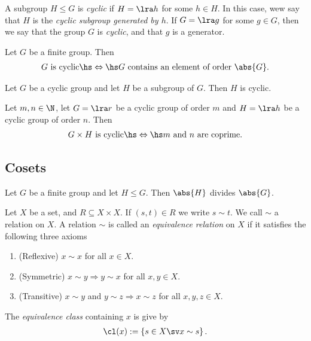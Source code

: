 \documentclass{article}
\begin{document}
\begin{definition}
    A subgroup $H\leq G$ is \emph{cyclic} if $H=\lra h$ for some
    $h\in H$. In this case, wew say that $H$ is the \emph{cyclic subgroup
    generated by $h$}. If $G=\lra g$ for some $g\in G$, then we
    say that the group $G$ is \emph{cyclic}, and that $g$ is a generator.
\end{definition}

\setcounter{theorem}{13}
\begin{lemma}
    Let $G$ be a finite group. Then
    \begin{align*}
        \text{$G$ is cyclic} \hs\Leftrightarrow\hs \text{$G$ contains an element of order $\abs{G}$}.
    \end{align*}
\end{lemma}

\begin{theorem}
    Let $G$ be a cyclic group and let $H$ be a subgroup of $G$. Then
    $H$ is cyclic.
\end{theorem}

\begin{theorem}
    Let $m,n\in\N$, let $G=\lra r$ be a cyclic group of order $m$
    and $H=\lra h$ be a cyclic group of order $n$. Then
    \begin{align*}
        \text{$G\times H$ is cyclic} \hs\Leftrightarrow\hs \text{$m$ and $n$ are coprime.}
    \end{align*}
\end{theorem}

\subsection{Cosets}

\begin{theorem}
    Let $G$ be a finite group and let $H\leq G$.
    Then $\abs{H}$ divides $\abs{G}$. 
\end{theorem}

\begin{definition}
    Let $X$ be a set, and $R\subseteq X\times X$.
    If $(s,t)\in R$ we write $s\sim t$. We call $\sim$
    a relation on $X$. A relation $\sim$ is called an
    \emph{equivalence relation} on $X$ if it satisfies
    the following three axioms
    \begin{enumerate}[label=E\arabic*.]
        \item (Reflexive) $x\sim x$ for all $x\in X$.
        \item (Symmetric) $x\sim y \Rightarrow y\sim x$ for all $x,y\in X$.
        \item (Transitive) $x\sim y$ and $y\sim z \Rightarrow x\sim z$ for all $x,y,z\in X$.
    \end{enumerate}
    The \emph{equivalence class} containing $x$ is give by
    \begin{align*}
        \cl(x) := \left\{s\in X \sv x\sim s\right\}.
    \end{align*}
\end{definition}
\end{document}
